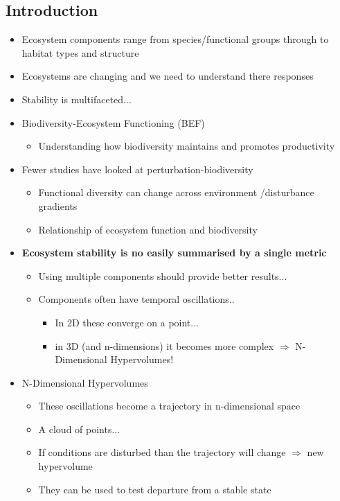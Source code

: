 \subsection*{Introduction}
\begin{itemize}
	\item Ecosystem components range from species/functional groups through to habitat types and structure
	\item Ecosystems are changing and we need to understand there responses
	\item Stability is multifaceted...
	\item Biodiversity-Ecosystem Functioning (BEF)
	\begin{itemize}
		\item Understanding how biodiversity maintains and promotes productivity
	\end{itemize}
	\item Fewer studies have looked at perturbation-biodiversity
	\begin{itemize}
		\item Functional diversity can change across environment /disturbance gradients
		\item Relationship of ecosystem function and biodiversity
	\end{itemize}
	\item \textbf{Ecosystem stability is no easily summarised by a single metric}
	\begin{itemize}
		\item Using multiple components should provide better results...
		\item Components often have temporal oscillations..
		\begin{itemize}
			\item In 2D these converge on a point...
			\item in 3D (and n-dimensions) it becomes more complex $\Rightarrow$ N-Dimensional Hypervolumes!
		\end{itemize}
	\end{itemize}
	\item N-Dimensional Hypervolumes
\begin{itemize}
	\item These oscillations become a trajectory in n-dimensional space
	\item A cloud of points...
	\item If conditions are disturbed than the trajectory will change $\Rightarrow$ new hypervolume
	\item They can be used to test departure from a stable state

\end{itemize}
\end{itemize}
